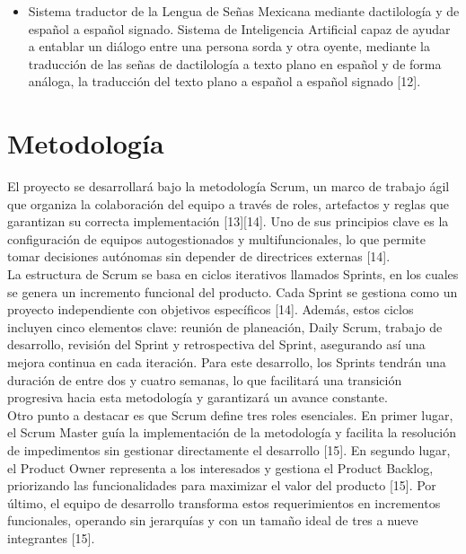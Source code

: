 \begin{itemize}
\item Sistema traductor de la Lengua de Señas Mexicana mediante dactilología y de español a español signado. Sistema de Inteligencia Artificial capaz de ayudar a entablar un diálogo entre una persona sorda y otra oyente, mediante la traducción de las señas de dactilología a  texto plano en español y de forma análoga, la traducción del texto plano a español a español signado [12].

	

\end{itemize}

\section{Metodología}
El proyecto se desarrollará bajo la metodología Scrum, un marco de trabajo ágil que organiza la colaboración del equipo a través de roles, artefactos y reglas que garantizan su correcta implementación [13][14]. Uno de sus principios clave es la configuración de equipos autogestionados y multifuncionales, lo que permite tomar decisiones autónomas sin depender de directrices externas [14].\\

La estructura de Scrum se basa en ciclos iterativos llamados Sprints, en los cuales se genera un incremento funcional del producto. Cada Sprint se gestiona como un proyecto independiente con objetivos específicos [14]. Además, estos ciclos incluyen cinco elementos clave: reunión de planeación, Daily Scrum, trabajo de desarrollo, revisión del Sprint y retrospectiva del Sprint, asegurando así una mejora continua en cada iteración. Para este desarrollo, los Sprints tendrán una duración de entre dos y cuatro semanas, lo que facilitará una transición progresiva hacia esta metodología y garantizará un avance constante.\\

Otro punto a destacar es que Scrum define tres roles esenciales. En primer lugar, el Scrum Master guía la implementación de la metodología y facilita la resolución de impedimentos sin gestionar directamente el desarrollo [15]. En segundo lugar, el Product Owner representa a los interesados y gestiona el Product Backlog, priorizando las funcionalidades para maximizar el valor del producto [15]. Por último, el equipo de desarrollo transforma estos requerimientos en incrementos funcionales, operando sin jerarquías y con un tamaño ideal de tres a nueve integrantes [15].\\

